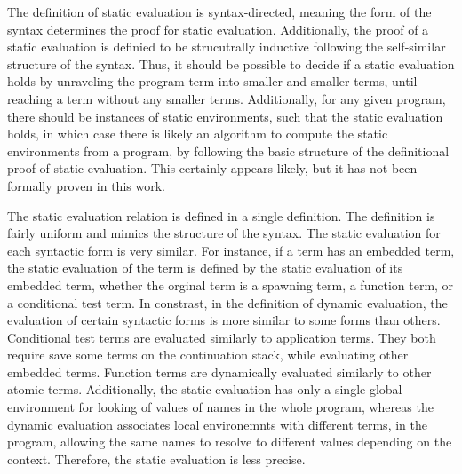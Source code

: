 \documentclass[letterpaper, 11pt]{extarticle}
\begin{document}
The definition of static evaluation is syntax-directed, meaning the form of the syntax
determines the proof for static evaluation.  Additionally, the proof of a static evaluation
is definied to be strucutrally inductive following the self-similar structure of the syntax.
Thus, it should be possible to decide if a static evaluation holds
by unraveling the program term into smaller and smaller terms,
until reaching a term without any smaller terms.
Additionally, for any given program, there should be instances of static environments,
such that the static evaluation holds, in which case there is likely an
algorithm to compute the static environments from a program,
by following the basic structure of the definitional proof of static evaluation.
This certainly appears likely, but it has not been formally proven in this work.

The static evaluation relation is defined in a single definition.
The definition is fairly uniform and mimics the structure of the syntax.
The static evaluation for each syntactic form is very similar.
For instance, if a term has an embedded term,
the static evaluation of the term is defined
by the static evaluation of its embedded term,
whether the orginal term is a spawning term, a function term, or a conditional test term.
In constrast, in the definition of dynamic evaluation,
the evaluation of certain syntactic forms is more similar to some forms than others.
Conditional test terms are evaluated similarly to application terms.  They both require
save some terms on the continuation stack, while evaluating other embedded terms.
Function terms are dynamically evaluated similarly to other atomic terms.
Additionally, the static evaluation has only a single global environment for
looking of values of names in the whole program, whereas the dynamic evaluation
associates local environemnts with different terms, in the program, allowing the same
names to resolve to different values depending on the context.  Therefore, the
static evaluation is less precise.
\end{document}
